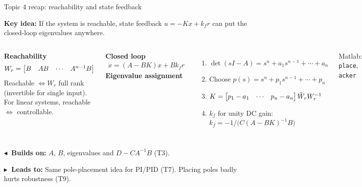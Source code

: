 \documentclass[10pt]{beamer-control}
\newcommand\LINKS[2]{%
  \par\vfill
  {\scriptsize\setlength\fboxsep{3pt}%
  \colorbox{AUHighlight!10}{\parbox{\dimexpr\linewidth-6pt\relax}{%
    \textbf{\color{AUHighlight}$\blacktriangleleft$~Builds on:} #1\par
    \textbf{\color{AUHighlight}$\blacktriangleright$~Leads to:} #2%
    \hfill\hyperlink{coursemap}{\beamerbutton{Course map}}}}}%
}
\newcommand\KEYIDEA[1]{%
  {\setlength\fboxsep{4pt}%
  \colorbox{NorthTce!12}{\parbox{\dimexpr\linewidth-8pt\relax}{\small\textbf{Key idea:} #1}}}\par\smallskip
}
\begin{document}
\begin{frame}[label=topic4]{Topic 4 recap: reachability and state feedback}
  \KEYIDEA{If the system is reachable, state feedback $u=-Kx+k_f r$ can put the closed-loop eigenvalues anywhere.}
  \begin{columns}[t]
    \footnotesize
    \textbf{Reachability}
    \begin{align*}
      W_r = \begin{bmatrix}B & AB & \cdots & A^{n-1}B\end{bmatrix}
    \end{align*}
    Reachable $\iff W_r$ full rank (invertible for single input). For linear systems, reachable $\iff$ controllable.
    \par\medskip
    \textbf{Closed loop}
    \begin{align*}
      \dot x = (A-BK)x + Bk_f r
    \end{align*}
    \footnotesize
    \textbf{Eigenvalue assignment}
    \begin{enumerate}
      \item $\det(sI-A) = s^n + a_1 s^{n-1} + \cdots + a_n$
      \item Choose $p(s) = s^n + p_1 s^{n-1} + \cdots + p_n$
      \item $K = \begin{bmatrix}p_1-a_1 & \cdots & p_n-a_n\end{bmatrix}\tilde W_r W_r^{-1}$
      \item $k_f$ for unity DC gain:\\ $k_f = -1/\bigl(C(A-BK)^{-1}B\bigr)$
    \end{enumerate}
    Matlab: \texttt{place}, \texttt{acker}
  \end{columns}
  \LINKS{$A$, $B$, eigenvalues and $D-CA^{-1}B$ (T3).}{Same pole-placement idea for PI/PID (T7). Placing poles badly hurts robustness (T9).}
\end{frame}
\end{document}
